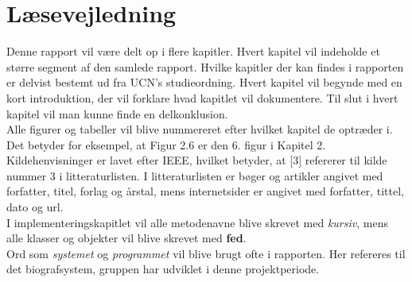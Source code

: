 \newpage
\section*{Læsevejledning}
Denne rapport vil være delt op i flere kapitler. Hvert kapitel vil indeholde et større segment af den samlede rapport.
Hvilke kapitler der kan findes i rapporten er delvist bestemt ud fra UCN's studieordning. 
Hvert kapitel vil begynde med en kort introduktion, der vil forklare hvad kapitlet vil dokumentere. 
Til slut i hvert kapitel vil man kunne finde en delkonklusion.\\ 

Alle figurer og tabeller vil blive nummereret efter hvilket kapitel de optræder i. Det betyder for eksempel, at Figur 2.6 er den 
6. figur i Kapitel 2. \\

Kildehenvisninger er lavet efter IEEE, hvilket betyder, at [3] refererer til kilde nummer 3 i litteraturlisten. 
I litteraturlisten er bøger og artikler angivet med forfatter, titel, forlag og årstal, mens internetsider er angivet med forfatter, tittel, dato og url. \\ 

I implementeringskapitlet vil alle metodenavne blive skrevet med \textit{kursiv}, mens alle klasser og objekter vil blive skrevet med \textbf{fed}.\\

Ord som \textit{systemet} og \textit{programmet} vil blive brugt ofte i rapporten. Her refereres til det biografsystem, gruppen har udviklet i denne projektperiode.